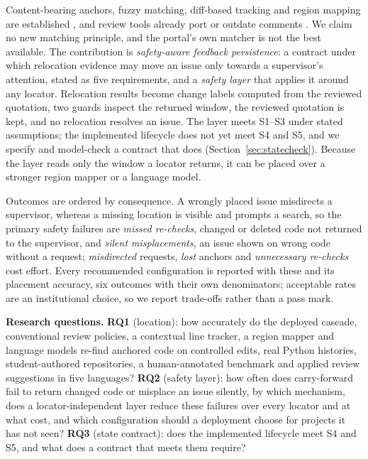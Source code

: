 Content-bearing anchors, fuzzy matching, diff-based tracking and region mapping are established \cite{brush2001robust,w3c2017annotation,asaduzzaman2013lhdiff,falleri2014fine,hu2026codemapper}, and review tools already port or outdate comments \cite{gerritporting,github2018outdating}. We claim no new matching principle, and the portal's own matcher is not the best available. The contribution is \emph{safety-aware feedback persistence}: a contract under which relocation evidence may move an issue only towards a supervisor's attention, stated as five requirements, and a \emph{safety layer} that applies it around any locator. Relocation results become change labels computed from the reviewed quotation, two guards inspect the returned window, the reviewed quotation is kept, and no relocation resolves an issue. The layer meets S1--S3 under stated assumptions; the implemented lifecycle does not yet meet S4 and S5, and we specify and model-check a contract that does (Section~\ref{sec:statecheck}). Because the layer reads only the window a locator returns, it can be placed over a stronger region mapper or a language model.

Outcomes are ordered by consequence. A wrongly placed issue misdirects a supervisor, whereas a missing location is visible and prompts a search, so the primary safety failures are \emph{missed re-checks}, changed or deleted code not returned to the supervisor, and \emph{silent misplacements}, an issue shown on wrong code without a request; \emph{misdirected} requests, \emph{lost} anchors and \emph{unnecessary re-checks} cost effort. Every recommended configuration is reported with these and its placement accuracy, six outcomes with their own denominators; acceptable rates are an institutional choice, so we report trade-offs rather than a pass mark.

\textbf{Research questions.} \textbf{RQ1} (location): how accurately do the deployed cascade, conventional review policies, a contextual line tracker, a region mapper and language models re-find anchored code on controlled edits, real Python histories, student-authored repositories, a human-annotated benchmark and applied review suggestions in five languages? \textbf{RQ2} (safety layer): how often does carry-forward fail to return changed code or misplace an issue silently, by which mechanism, does a locator-independent layer reduce these failures over every locator and at what cost, and which configuration should a deployment choose for projects it has not seen? \textbf{RQ3} (state contract): does the implemented lifecycle meet S4 and S5, and what does a contract that meets them require?

